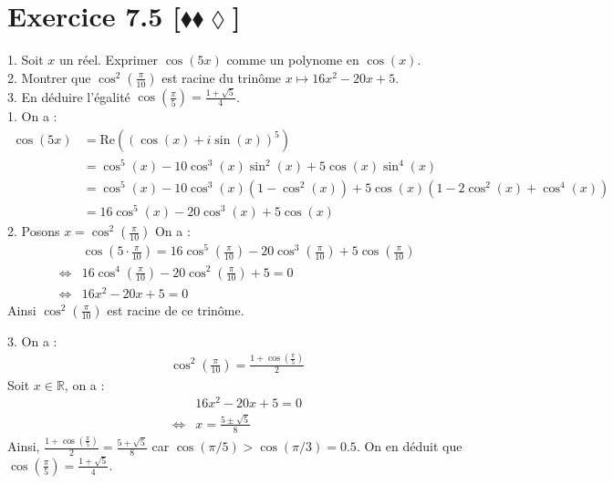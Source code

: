 \documentclass[10pt]{article}
\begin{document}
\section*{Exercice 7.5 [$\blacklozenge\blacklozenge\lozenge$]}
\begin{tcolorbox}[enhanced, width=7in, center, size=fbox, fontupper=\large, drop shadow southwest]
    1. Soit $x$ un réel. Exprimer $\cos(5x)$ comme un polynome en $\cos(x)$.\\
    2. Montrer que $\cos^2\left(\frac{\pi}{10}\right)$ est racine du trinôme $x \mapsto 16x^2 - 20x + 5$.\\
    3. En déduire l'égalité $\cos\left(\frac{\pi}{5}\right)=\frac{1+\sqrt{5}}{4}$.\\
    1. On a :
    \begin{align*}
        \cos(5x) &= \text{Re}\left((\cos(x)+i\sin(x))^5\right) \\
        &= \cos^5(x) - 10\cos^3(x)\sin^2(x) + 5\cos(x)\sin^4(x)\\
        &= \cos^5(x) - 10\cos^3(x)(1-\cos^2(x)) + 5\cos(x)(1 - 2\cos^2(x) + \cos^4(x))\\
        &= 16\cos^5(x) - 20\cos^3(x) + 5\cos(x)
    \end{align*}
    2. Posons $x = \cos^2\left( \frac{\pi}{10} \right)$ On a :
    \begin{align*}
        &\cos\left(5\cdot\frac{\pi}{10}\right)=16\cos^5\left(\frac{\pi}{10}\right)-20\cos^3\left( \frac{\pi}{10} \right) + 5\cos\left( \frac{\pi}{10} \right)\\
        \iff&16\cos^4\left( \frac{\pi}{10} \right) - 20\cos^2 \left( \frac{\pi}{10} \right) + 5 = 0\\
        \iff& 16x^2 - 20x + 5 = 0
    \end{align*}
    Ainsi $\cos^2\left( \frac{\pi}{10} \right)$ est racine de ce trinôme.
\end{tcolorbox}

\begin{tcolorbox}[enhanced, width=7in, center, size=fbox, fontupper=\large, drop shadow southwest]
    3. On a :
    \begin{align*}
        \cos^2 \left( \frac{\pi}{10} \right) = \frac{1+\cos(\frac{\pi}{5})}{2}
    \end{align*}
    Soit $x\in\mathbb{R}$, on a :
    \begin{align*}
        &16x^2-20x+5=0\\
        \iff& x = \frac{5 \pm \sqrt{5}}{8}
    \end{align*}
    Ainsi, $\frac{1+\cos\left(\frac{\pi}{5}\right)}{2}=\frac{5+\sqrt{5}}{8}$ car $\cos(\pi/5) > \cos(\pi/3) = 0.5$. On en déduit que $\cos\left( \frac{\pi}{5} \right)=\frac{1+\sqrt{5}}{4}$.
\end{tcolorbox}
\end{document}
